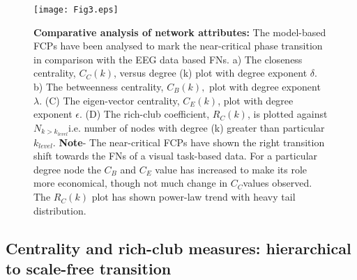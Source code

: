 \documentclass[preprintnumbers,amsmath,amssymb,onecolumn]{revtex4}
\begin{document}
\begin{figure}
\label{fig3}
\begin{center}
\texttt{[image: Fig3.eps]}
\caption{\textbf{Comparative analysis of network attributes: }The model-based
FCPs have been analysed to mark the near-critical phase transition
in comparison with the EEG data based FNs. a) The closeness centrality,
$C_{C}(k)$, versus degree (k) plot with degree exponent $\delta$.
b) The betweenness centrality, $C_{B}(k),$ plot with degree exponent
$\lambda$. (C) The eigen-vector centrality, $C_{E}(k)$, plot with
degree exponent $\epsilon$. (D) The rich-club coefficient, $R_{C}(k)$,
is plotted against $N_{k>k_{level}}$i.e. number of nodes with degree
(k) greater than particular $k_{level}$. \textbf{Note}- The near-critical
FCPs have shown the right transition shift towards the FNs of a visual
task-based data. For a particular degree node the $C_{B}$ and $C_{E}$
value has increased to make its role more economical, though not much
change in $C_{C}$values observed. The $R_{C}(k)$ plot has shown
power-law trend with heavy tail distribution.} 
\end{center}
\end{figure}

\subsection{Centrality and rich-club measures: hierarchical to scale-free transition}
\end{document}

